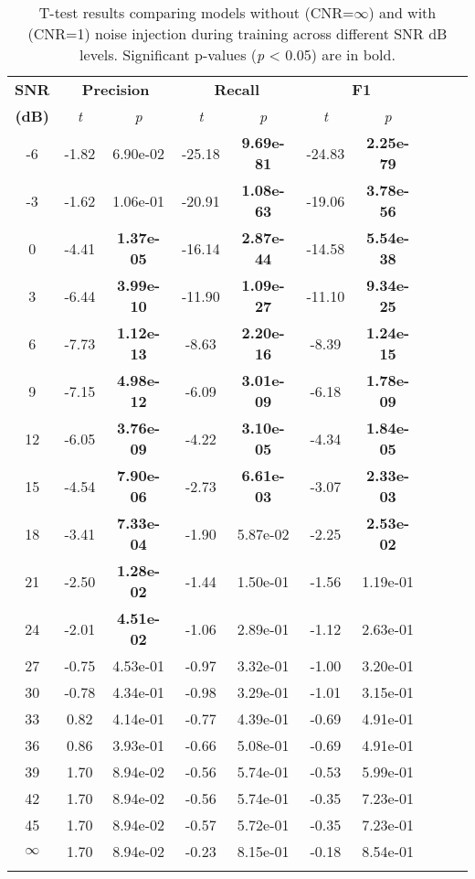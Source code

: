 \documentclass{article}
\begin{document}
\begin{table}[h!]
\centering
\caption{T-test results comparing models without (CNR=$\infty$) and with (CNR=1) noise injection during training across different SNR dB levels. Significant p-values (\textit{p} < 0.05) are in bold.}
\scriptsize
\begin{tabular}{@{}c ccc ccc ccc@{}} %
\toprule
\textbf{SNR} & \multicolumn{2}{c}{\textbf{Precision}} & \multicolumn{2}{c}{\textbf{Recall}} & \multicolumn{2}{c}{\textbf{F1}} \\ 
\textbf{(dB)} & \textit{t} & \textit{p} & \textit{t} & \textit{p} & \textit{t} & \textit{p} \\
\midrule
-6  & -1.82  & 6.90e-02  & -25.18  & \textbf{9.69e-81}  & -24.83  & \textbf{2.25e-79} \\
-3  & -1.62  & 1.06e-01  & -20.91  & \textbf{1.08e-63}  & -19.06  & \textbf{3.78e-56} \\
0   & -4.41  & \textbf{1.37e-05}  & -16.14  & \textbf{2.87e-44}  & -14.58  & \textbf{5.54e-38} \\
3   & -6.44  & \textbf{3.99e-10}  & -11.90  & \textbf{1.09e-27}  & -11.10  & \textbf{9.34e-25} \\
6   & -7.73  & \textbf{1.12e-13}  & -8.63   & \textbf{2.20e-16}  & -8.39   & \textbf{1.24e-15} \\
9   & -7.15  & \textbf{4.98e-12}  & -6.09   & \textbf{3.01e-09}  & -6.18   & \textbf{1.78e-09} \\
12  & -6.05  & \textbf{3.76e-09}  & -4.22   & \textbf{3.10e-05}  & -4.34   & \textbf{1.84e-05} \\
15  & -4.54  & \textbf{7.90e-06}  & -2.73   & \textbf{6.61e-03}  & -3.07   & \textbf{2.33e-03} \\
18  & -3.41  & \textbf{7.33e-04}  & -1.90   & 5.87e-02  & -2.25   & \textbf{2.53e-02} \\
21  & -2.50  & \textbf{1.28e-02}  & -1.44   & 1.50e-01  & -1.56   & 1.19e-01 \\
24  & -2.01  & \textbf{4.51e-02}  & -1.06   & 2.89e-01  & -1.12   & 2.63e-01 \\
27  & -0.75  & 4.53e-01  & -0.97   & 3.32e-01  & -1.00   & 3.20e-01 \\
30  & -0.78  & 4.34e-01  & -0.98   & 3.29e-01  & -1.01   & 3.15e-01 \\
33  & 0.82   & 4.14e-01  & -0.77   & 4.39e-01  & -0.69   & 4.91e-01 \\
36  & 0.86   & 3.93e-01  & -0.66   & 5.08e-01  & -0.69   & 4.91e-01 \\
39  & 1.70   & 8.94e-02  & -0.56   & 5.74e-01  & -0.53   & 5.99e-01 \\
42  & 1.70   & 8.94e-02  & -0.56   & 5.74e-01  & -0.35   & 7.23e-01 \\
45  & 1.70   & 8.94e-02  & -0.57   & 5.72e-01  & -0.35   & 7.23e-01 \\
$\infty$ & 1.70   & 8.94e-02  & -0.23   & 8.15e-01  & -0.18   & 8.54e-01 \\
\bottomrule
\label{tab:2}
\end{tabular}
\end{table}
\end{document}
